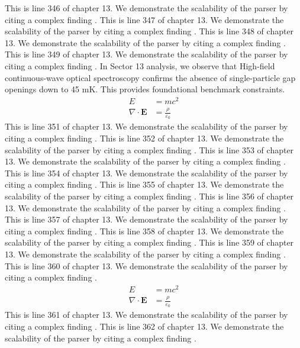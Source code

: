 This is line 346 of chapter 13. We demonstrate the scalability of the parser by citing a complex finding \cite{ref13_346}.
This is line 347 of chapter 13. We demonstrate the scalability of the parser by citing a complex finding \cite{ref13_347}.
This is line 348 of chapter 13. We demonstrate the scalability of the parser by citing a complex finding \cite{ref13_348}.
This is line 349 of chapter 13. We demonstrate the scalability of the parser by citing a complex finding \cite{ref13_349}.
In Sector 13 analysis, we observe that High-field continuous-wave optical spectroscopy confirms the absence of single-particle gap openings down to 45 mK. This provides foundational benchmark constraints.
\begin{align*}
  E &= mc^2 \\
  \nabla \cdot \mathbf{E} &= \frac{\rho}{\varepsilon_0}
\end{align*}
This is line 351 of chapter 13. We demonstrate the scalability of the parser by citing a complex finding \cite{ref13_351}.
This is line 352 of chapter 13. We demonstrate the scalability of the parser by citing a complex finding \cite{ref13_352}.
This is line 353 of chapter 13. We demonstrate the scalability of the parser by citing a complex finding \cite{ref13_353}.
This is line 354 of chapter 13. We demonstrate the scalability of the parser by citing a complex finding \cite{ref13_354}.
This is line 355 of chapter 13. We demonstrate the scalability of the parser by citing a complex finding \cite{ref13_355}.
This is line 356 of chapter 13. We demonstrate the scalability of the parser by citing a complex finding \cite{ref13_356}.
This is line 357 of chapter 13. We demonstrate the scalability of the parser by citing a complex finding \cite{ref13_357}.
This is line 358 of chapter 13. We demonstrate the scalability of the parser by citing a complex finding \cite{ref13_358}.
This is line 359 of chapter 13. We demonstrate the scalability of the parser by citing a complex finding \cite{ref13_359}.
This is line 360 of chapter 13. We demonstrate the scalability of the parser by citing a complex finding \cite{ref13_360}.
\begin{align*}
  E &= mc^2 \\
  \nabla \cdot \mathbf{E} &= \frac{\rho}{\varepsilon_0}
\end{align*}
This is line 361 of chapter 13. We demonstrate the scalability of the parser by citing a complex finding \cite{ref13_361}.
This is line 362 of chapter 13. We demonstrate the scalability of the parser by citing a complex finding \cite{ref13_362}.
